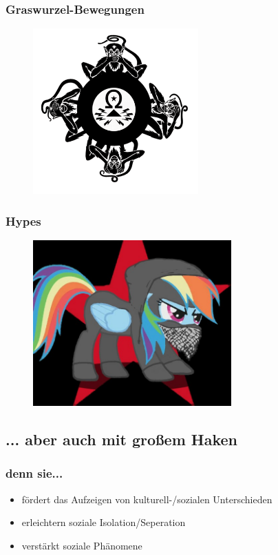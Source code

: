 \documentclass{beamer}
\begin{document}
\frame
{
  \frametitle{Graswurzel-Bewegungen}
   \begin{figure}[p] %
     \centering
     \includegraphics[width=2.5in]{telecomix.png} 
  \end{figure}
}
\frame
{
  \frametitle{Hypes}
    \begin{figure}[p] %
     \centering
     \includegraphics[width=3in]{RiotPwny.jpg} 
  \end{figure}
}

\subsection{... aber auch mit großem Haken}

\frame
{
  \frametitle{denn sie...}

  \begin{itemize}[<+->]
  \item fördert das Aufzeigen von kulturell-/sozialen Unterschieden
  \item erleichtern soziale Isolation/Seperation
  \item verstärkt soziale Phänomene
  \end{itemize}
}
\end{document}
